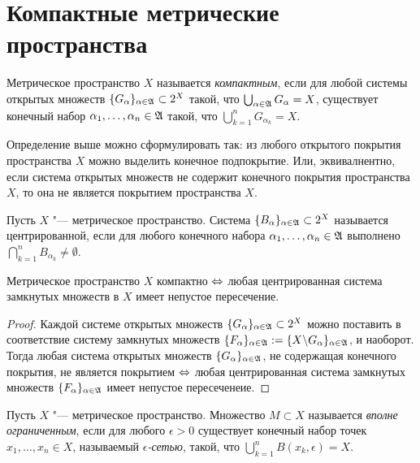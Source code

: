 \section{Компактные метрические пространства}

\begin{definition}
    Метрическое пространство $X$ называется \textit{компактным}, если для любой системы открытых множеств $\{G_\alpha\}_{\alpha \in \mathfrak A} \subset 2^X$ такой, что $\bigcup_{\alpha \in \mathfrak A} G_\alpha = X$, существует конечный набор $\alpha_1, \dotsc, \alpha_n \in \mathfrak A$ такой, что $\bigcup_{k = 1}^n G_{\alpha_k} = X$.
\end{definition}

\begin{note}
    Определение выше можно сформулировать так: из любого открытого покрытия пространства $X$ можно выделить конечное подпокрытие. Или, эквивалнентно, если система открытых множеств не содержит конечного покрытия пространства $X$, то она не является покрытием пространства $X$.
\end{note}

\begin{definition}
    Пусть $X$ "--- метрическое пространство. Система $\{B_\alpha\}_{\alpha \in \mathfrak A} \subset 2^X$ называется центрированной, если для любого конечного набора $\alpha_1, \dotsc, \alpha_n \in \mathfrak A$ выполнено $\bigcap_{k = 1}^n B_{\alpha_k} \ne \emptyset$.
\end{definition}

\begin{theorem}\label{thm3.1}
    Метрическое пространство $X$ компактно $\Leftrightarrow$ любая центрированная система замкнутых множеств в $X$ имеет непустое пересечение.
\end{theorem}

\begin{proof}
    Каждой системе открытых множеств $\{G_\alpha\}_{\alpha \in \mathfrak A} \subset 2^X$ можно поставить в соответствие систему замкнутых множеств $\{F_\alpha\}_{\alpha \in \mathfrak A} := \{X \backslash G_\alpha\}_{\alpha \in \mathfrak A}$, и наоборот. Тогда любая система открытых множеств $\{G_\alpha\}_{\alpha \in \mathfrak A}$, не содержащая конечного покрытия, не является покрытием $\Leftrightarrow$ любая центрированная система замкнутых множеств $\{F_{\alpha}\}_{\alpha \in \mathfrak A}$ имеет непустое пересеченеие.
\end{proof}

\begin{definition}
    Пусть $X$ "--- метрическое пространство. Множество $M \subset X$ называется \textit{вполне ограниченным}, если для любого $\epsilon > 0$ существует конечный набор точек $x_1, \dotsc, x_n \in X$, называемый \textit{$\epsilon$-сетью}, такой, что $\bigcup_{k = 1}^n B(x_k, \epsilon) = X$.
\end{definition}


